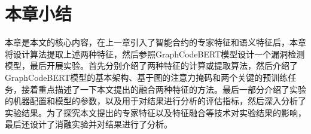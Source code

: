 \section{本章小结}
\label{sec:本章小结4}
本章是本文的核心内容，在上一章引入了智能合约的专家特征和语义特征后，本章将设计算法提取上述两种特征，然后参照GraphCodeBERT模型设计一个漏洞检测模型，最后开展实验。首先分别介绍了两种特征的计算或提取算法，然后介绍了GraphCodeBERT模型的基本架构、基于图的注意力掩码和两个关键的预训练任务，接着重点描述了一下本文提出的融合两种特征的方法。最后一部分介绍了实验的机器配置和模型的参数，以及用于对结果进行分析的评估指标，然后深入分析了实验结果。为了探究本文提出的专家特征以及特征融合等技术对实验结果的影响，最后还设计了消融实验并对结果进行了分析。
